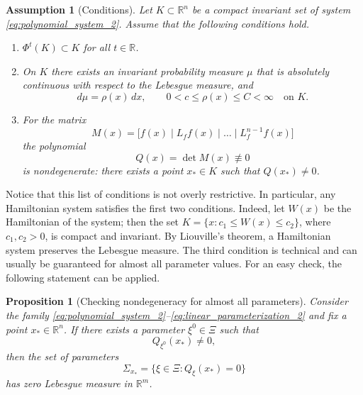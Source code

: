 \documentclass[11pt]{article}
\newcommand{\R}{\mathbb{R}}
\newcommand{\dd}{\,d}
\theoremstyle{thmstyleone}
\newtheorem{proposition}[theorem]{Proposition}
\theoremstyle{thmstyletwo}
\newtheorem{assumption}[theorem]{Assumption}
\theoremstyle{thmstylethree}
\begin{document}
\begin{assumption}[Conditions]
\label{ass:main_2}
Let $K\subset\R^n$ be a compact invariant set of system \eqref{eq:polynomial_system_2}. Assume that the following conditions hold.
\begin{enumerate}[label=(A\arabic*)]
    \item $\Phi^t(K) \subset K$ for all $t\in\R$.
    \item On $K$ there exists an invariant probability measure $\mu$ that is absolutely continuous with respect to the Lebesgue measure, and
    \[
        d\mu=\rho(x)\dd x,
        \qquad
        0<c\le \rho(x)\le C<\infty
        \quad \text{on }K.
    \]
    \item For the matrix
    \[
        M(x)=\bigl[f(x)\mid L_f f(x)\mid\dots\mid L_f^{n-1}f(x)\bigr]
    \]
    the polynomial
    \[
        Q(x)=\det M(x) \not\equiv 0
    \]
    is nondegenerate: there exists a point $x_*\in K$ such that $Q(x_*)\ne0$.
\end{enumerate}
\end{assumption}

Notice that this list of conditions is not overly restrictive. In particular, any Hamiltonian system satisfies the first two conditions. Indeed, let $W(x)$ be the Hamiltonian of the system; then the set $K = \{x:c_1\le W(x) \le c_2\}$, where $c_1,c_2 > 0$, is compact and invariant. By Liouville's theorem, a Hamiltonian system preserves the Lebesgue measure. The third condition is technical and can usually be guaranteed for almost all parameter values. For an easy check, the following statement can be applied.

\begin{proposition}[Checking nondegeneracy for almost all parameters]
\label{prop:param_nondegeneracy_2}
Consider the family \eqref{eq:polynomial_system_2}--\eqref{eq:linear_parameterization_2} and fix a point $x_*\in\R^n$. If there exists a parameter $\xi^0\in\Xi$ such that
\[
    Q_{\xi^0}(x_*)\ne0,
\]
then the set of parameters
\[
    \Sigma_{x_*}=\{\xi\in\Xi:Q_\xi(x_*)=0\}
\]
has zero Lebesgue measure in $\R^m$.
\end{proposition}
\end{document}

